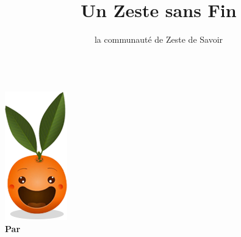 \documentclass[12pt,a4paper]{book}
\title{Un Zeste sans Fin}
\author{la communauté de Zeste de Savoir}
\begin{document}
\makeatletter

\begin{titlepage}
	\centering
	\vspace*{5cm}
	{\Huge \textsf{\textbf{\@title}}}\\
	\vspace{2em}
	\includegraphics{clem.png}\\

	\vfill
	{\large \textsf{\textbf{Par \@author}}}\\
\end{titlepage}

\makeatother







\tableofcontents
\end{document}
